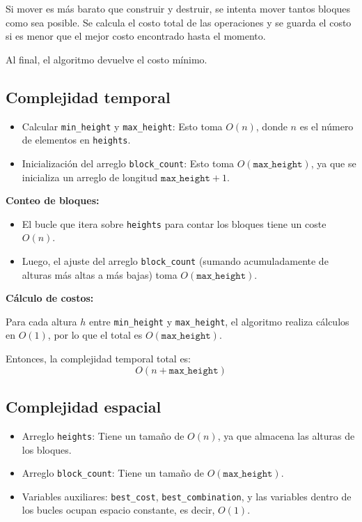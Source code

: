 \documentclass[a4paper,12pt]{article}
\begin{document}
Si mover es más barato que construir y destruir, se intenta mover tantos bloques como sea posible. Se calcula el costo total de las operaciones y se guarda el costo si es menor que el mejor costo encontrado hasta el momento.

Al final, el algoritmo devuelve el costo mínimo.

\subsection{Complejidad temporal}
\begin{itemize}
	\item Calcular \texttt{min\_height} y \texttt{max\_height}: Esto toma \(O(n)\), donde \(n\) es el número de elementos en \texttt{heights}.
	\item Inicialización del arreglo \texttt{block\_count}: Esto toma \(O(\texttt{max\_height})\), ya que se inicializa un arreglo de longitud \(\texttt{max\_height}+1\).
\end{itemize}

\textbf{Conteo de bloques:}
\begin{itemize}
	\item El bucle que itera sobre \texttt{heights} para contar los bloques tiene un coste \(O(n)\).
	\item Luego, el ajuste del arreglo \texttt{block\_count} (sumando acumuladamente de alturas más altas a más bajas) toma \(O(\texttt{max\_height})\).
\end{itemize}

\textbf{Cálculo de costos:}

Para cada altura \(h\) entre \texttt{min\_height} y \texttt{max\_height}, el algoritmo realiza cálculos en \(O(1)\), por lo que el total es \(O(\texttt{max\_height})\).

Entonces, la complejidad temporal total es:
\[
O(n + \texttt{max\_height})
\]

\subsection{Complejidad espacial}
\begin{itemize}
	\item Arreglo \texttt{heights}: Tiene un tamaño de \(O(n)\), ya que almacena las alturas de los bloques.
	\item Arreglo \texttt{block\_count}: Tiene un tamaño de \(O(\texttt{max\_height})\).
	\item Variables auxiliares: \texttt{best\_cost}, \texttt{best\_combination}, y las variables dentro de los bucles ocupan espacio constante, es decir, \(O(1)\).
\end{itemize}
\end{document}

